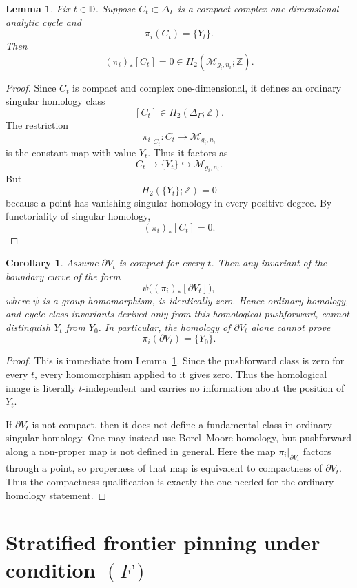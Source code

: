 \documentclass[12pt]{article}
\theoremstyle{plain}
\newtheorem{lemma}[theorem]{Lemma}
\newtheorem{corollary}[theorem]{Corollary}
\theoremstyle{definition}
\theoremstyle{remark}
\newcommand{\D}{\mathbb D}
\newcommand{\Z}{\mathbb Z}
\newcommand{\M}{\mathcal M}
\begin{document}
\begin{lemma}\label{lem:pushforward}
Fix \(t\in \D\).  Suppose \(C_t\subset \Delta_\Gamma\) is a compact complex one-dimensional analytic cycle and
\[
\pi_i(C_t)=\{Y_t\}.
\]
Then
\[
(\pi_i)_*[C_t]=0\in H_2(\M_{g_i,n_i};\Z).
\]
\end{lemma}

\begin{proof}
Since \(C_t\) is compact and complex one-dimensional, it defines an ordinary singular homology class
\[
[C_t]\in H_2(\Delta_\Gamma;\Z).
\]
The restriction
\[
\pi_i|_{C_t}:C_t\to \M_{g_i,n_i}
\]
is the constant map with value \(Y_t\).  Thus it factors as
\[
C_t\longrightarrow \{Y_t\}\hookrightarrow \M_{g_i,n_i}.
\]
But
\[
H_2(\{Y_t\};\Z)=0
\]
because a point has vanishing singular homology in every positive degree.  By functoriality of singular homology,
\[
(\pi_i)_*[C_t]=0.
\]
\end{proof}

\begin{corollary}\label{cor:hom-blind}
Assume \(\partial V_t\) is compact for every \(t\).  Then any invariant of the boundary curve of the form
\[
\psi\bigl((\pi_i)_*[\partial V_t]\bigr),
\]
where \(\psi\) is a group homomorphism, is identically zero.  Hence ordinary homology, and cycle-class invariants derived only from this homological pushforward, cannot distinguish \(Y_t\) from \(Y_0\).  In particular, the homology of \(\partial V_t\) alone cannot prove
\[
\pi_i(\partial V_t)=\{Y_0\}.
\]
\end{corollary}

\begin{proof}
This is immediate from Lemma~\ref{lem:pushforward}.  Since the pushforward class is zero for every \(t\), every homomorphism applied to it gives zero.  Thus the homological image is literally \(t\)-independent and carries no information about the position of \(Y_t\).

If \(\partial V_t\) is not compact, then it does not define a fundamental class in ordinary singular homology.  One may instead use Borel--Moore homology, but pushforward along a non-proper map is not defined in general.  Here the map \(\pi_i|_{\partial V_t}\) factors through a point, so properness of that map is equivalent to compactness of \(\partial V_t\).  Thus the compactness qualification is exactly the one needed for the ordinary homology statement.
\end{proof}

\section{Stratified frontier pinning under condition \((F)\)}\label{sec:stratified}
\end{document}
